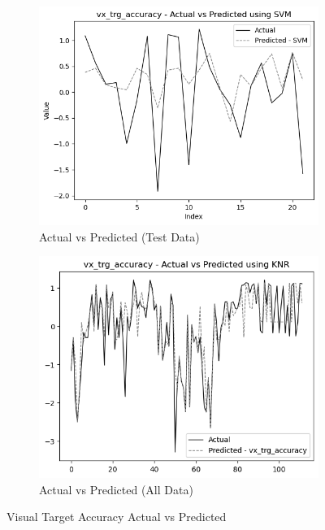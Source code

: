 \begin{figure}[htbp]
    \centering
    \begin{subfigure}[b]{0.49\textwidth}
        \centering
        \includegraphics[width=\textwidth]{images/test_data_visual_target_accuracy.png}
        \caption{Actual vs Predicted (Test Data)}
        \label{fig:actual_vs_predicted_vx_trg_accuracy_test}
    \end{subfigure}\hfill
    \begin{subfigure}[b]{0.49\textwidth}
        \centering
        \includegraphics[width=\textwidth]{images/all_data_visual_target_accuracy.png}
        \caption{Actual vs Predicted (All Data)}
        \label{fig:actual_vs_predicted_vx_trg_accuracy_all_data}
    \end{subfigure}
    \caption{Visual Target Accuracy Actual vs Predicted}
    \label{fig:visual_target_accuracy_comparison}
\end{figure}

